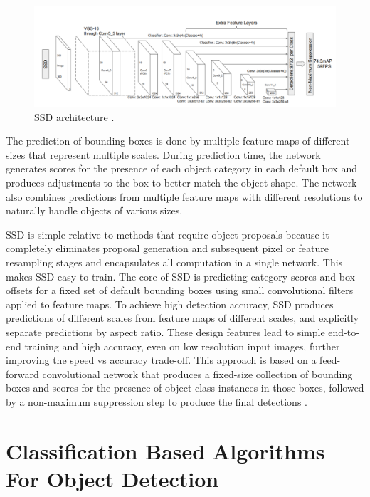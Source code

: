     \begin{figure}[H]
        \centering
        \captionsetup{justification=centering}
        \includegraphics[width=\textwidth]{Sections/2StateOfTheArt/2_images/ssd_arch.png}
        \caption[SSD architecture.]{SSD architecture \cite{Liu2016}.} 
        \label{fig:ssd}
    \end{figure}



    \par The prediction of bounding boxes is done by multiple feature maps of different sizes that represent multiple scales. During prediction time, the network generates scores for the presence of each object category in each default box and produces adjustments to the box to better match the object shape. The network also combines predictions from multiple feature maps with different resolutions to naturally handle objects of various sizes.
    \par SSD is simple relative to methods that require object proposals because it completely eliminates proposal generation and subsequent pixel or feature resampling stages and encapsulates all computation in a single network. This makes SSD easy to train. The core of SSD is predicting category scores and box offsets for a fixed set of default bounding boxes using small convolutional filters applied to feature maps. To achieve high detection accuracy, SSD produces predictions of different scales from feature maps of different scales, and explicitly separate predictions by aspect ratio. These design features lead to simple end-to-end training and high accuracy, even on low resolution input images, further improving the speed vs accuracy trade-off. This approach is based on a feed-forward convolutional network that produces a fixed-size collection of bounding boxes and scores for the presence of object class instances in those boxes, followed by a non-maximum suppression step to produce the final detections \cite{Liu2016}.
   
   

\section{Classification Based Algorithms For Object Detection}
\label{sec:classification}

